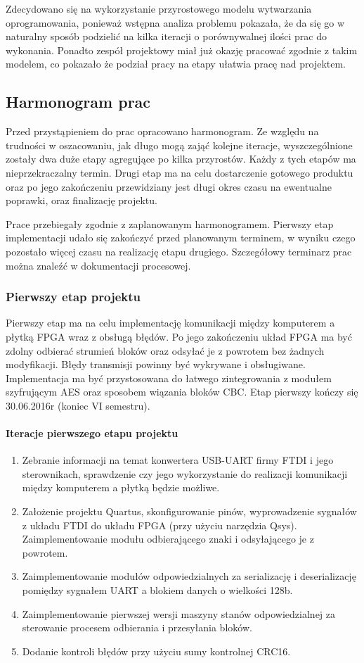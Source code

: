 Zdecydowano się na wykorzystanie przyrostowego modelu wytwarzania oprogramowania, ponieważ wstępna analiza problemu pokazała, że da się go w naturalny sposób podzielić na kilka iteracji o porównywalnej ilości prac do wykonania. Ponadto zespół projektowy miał już okazję pracować zgodnie z takim modelem, co pokazało że podział pracy na etapy ułatwia pracę nad projektem.

\subsection{Harmonogram prac}
Przed przystąpieniem do prac opracowano harmonogram. Ze względu na trudności w oszacowaniu, jak długo mogą zająć kolejne iteracje, wyszczególnione zostały dwa duże etapy agregujące po kilka przyrostów. Każdy z tych etapów ma nieprzekraczalny termin. Drugi etap ma na celu dostarczenie gotowego produktu oraz po jego zakończeniu przewidziany jest długi okres czasu na ewentualne poprawki, oraz finalizację projektu.

Prace przebiegały zgodnie z zaplanowanym harmonogramem. Pierwszy etap implementacji udało się zakończyć przed planowanym terminem, w wyniku czego pozostało więcej czasu na realizację etapu drugiego. Szczegółowy terminarz prac można znaleźć w dokumentacji procesowej.

\subsubsection{Pierwszy etap projektu}
Pierwszy etap ma na celu implementację komunikacji między komputerem a płytką FPGA wraz z obsługą błędów. Po jego zakończeniu układ FPGA ma być zdolny odbierać strumień bloków oraz odsyłać je z powrotem bez żadnych modyfikacji. Błędy transmisji powinny być wykrywane i obsługiwane. Implementacja ma być przystosowana do łatwego zintegrowania z modułem szyfrującym AES oraz sposobem wiązania bloków CBC. Etap pierwszy kończy się 30.06.2016r (koniec VI semestru).

\paragraph{Iteracje pierwszego etapu projektu}
\begin{enumerate}
\item Zebranie informacji na temat konwertera USB-UART firmy FTDI i jego sterownikach, sprawdzenie czy jego wykorzystanie do realizacji komunikacji między komputerem a płytką będzie możliwe.
\item Założenie projektu Quartus, skonfigurowanie pinów, wyprowadzenie sygnałów z układu FTDI do układu FPGA (przy użyciu narzędzia Qsys). Zaimplementowanie modułu odbierającego znaki i odsyłającego je z powrotem.
\item Zaimplementowanie modułów odpowiedzialnych za serializację i deserializację pomiędzy sygnałem UART a blokiem danych o wielkości 128b.
\item Zaimplementowanie pierwszej wersji maszyny stanów odpowiedzialnej za sterowanie procesem odbierania i przesyłania bloków.
\item Dodanie kontroli błędów przy użyciu sumy kontrolnej CRC16.
\end{enumerate}

